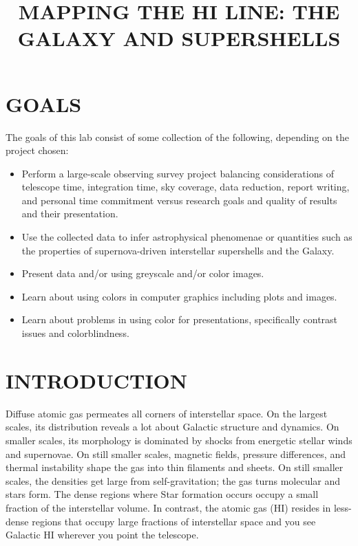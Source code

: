 \documentclass[psfig,preprint]{aastex}
\begin{document}
\def\simlt{\lower.5ex\hbox{$\; \buildrel < \over \sim \;$}}
\def\simgt{\lower.5ex\hbox{$\; \buildrel > \over \sim \;$}}

\title{MAPPING THE HI LINE: THE GALAXY AND SUPERSHELLS}

\tableofcontents

\section{GOALS} 

The goals of this lab consist of some collection of the following,
depending on the project chosen: \begin{itemize}

  \item Perform a large-scale observing survey project balancing
    considerations of telescope time, integration time, sky coverage,
    data reduction, report writing, and personal time commitment versus
    research goals and quality of results and their presentation.

\item Use the collected data to infer astrophysical phenomenae or
  quantities such as the properties of supernova-driven interstellar
  supershells and the Galaxy.

\item Present data and/or using greyscale and/or color images.

\item Learn about using colors in computer graphics including plots and
  images. 

\item Learn about problems in using color for presentations,
  specifically contrast issues and colorblindness.

\end{itemize}


\section{INTRODUCTION}

	Diffuse atomic gas permeates all corners of interstellar space.
On the largest scales, its distribution reveals a lot about Galactic
structure and dynamics. On smaller scales, its morphology is dominated
by shocks from energetic stellar winds and supernovae. On still smaller
scales, magnetic fields, pressure differences, and thermal instability
shape the gas into thin filaments and sheets. On still smaller scales,
the densities get large from self-gravitation; the gas turns molecular
and stars form. 
The dense regions where Star formation occurs occupy a
small fraction of the interstellar volume. In contrast, the atomic gas
(HI) resides in less-dense regions that occupy large fractions of
interstellar space and you see Galactic HI wherever you point the
telescope. 
\end{document}
